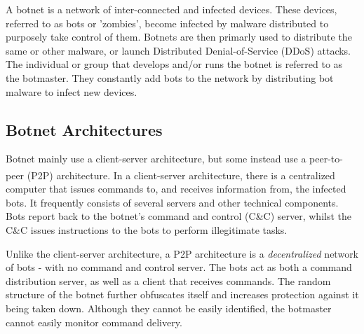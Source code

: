 \raggedright
A botnet is a network of inter-connected and infected devices. These devices, referred to as bots or 'zombies', become
infected by malware distributed to purposely take control of them. Botnets are then primarly used to distribute the
same or other malware, or launch Distributed Denial-of-Service (DDoS) attacks. The individual or group that develops
and/or runs the botnet is referred to as the botmaster. They constantly add bots to the network by distributing
bot malware to infect new devices.

\subsection{Botnet Architectures}

Botnet mainly use a client-server architecture, but some instead use a peer-to-peer (P2P) architecture\textsuperscript{\cite{fedynyshyn2011detection}}. In a client-server
architecture, there is a centralized computer that issues commands to, and receives information from, the infected bots.
It frequently consists of several servers and other technical components. Bots report back to the botnet's command and control
(C\&C) server, whilst the C\&C issues instructions to the bots to perform illegitimate tasks.

Unlike the client-server architecture, a P2P architecture is a \textit{decentralized} network of bots - with no command and control server.
The bots act as both a command distribution server, as well as a client that receives commands. The random structure of the botnet
further obfuscates itself and increases protection against it being taken down. Although they cannot be easily identified,
the botmaster cannot easily monitor command delivery.

\vspace{0.5cm}

